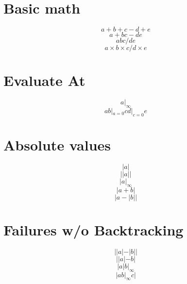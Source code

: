 \documentclass{article}
\begin{document}
%
%
%
%
%

\section{Basic math}
\[ a + b + c - d + e \]
\[ a + b c - d  e \]
\[ a b c / d e \]
\[ a \times b \times c / d \times e \]

\section{Evaluate At}
\[  a |_\infty \]
\[ a b |_{a=0} c d |_{c=0} e \]

\section{Absolute values}
\[  |a| \]
\[ ||a|| \]
\[  |a |_\infty \]
\[  |a + b| \]
\[  |a - |b|| \]

\section{Failures w/o Backtracking}
\[  ||a| - |b|| \]
\[ ||a|-b| \]
\[  |a | b |_\infty \]
\[  |a b |_\infty c | \]
\end{document}
